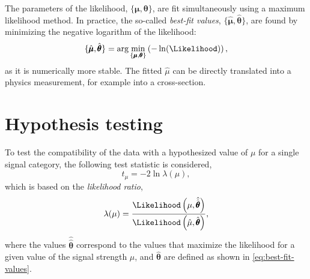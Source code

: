 
The parameters of the likelihood, $\{\pmb{\mu}, \pmb{\theta} \}$, are fit simultaneously using a maximum likelihood method. 
In practice, the so-called \emph{best-fit values}, $\{\hat{\pmb{\mu}}, \hat{\pmb{\theta}} \}$, are found by minimizing the negative logarithm of the likelihood:
\begin{equation}
    \label{eq:best-fit-values}
    \{\hat{\pmb{\mu}}, \hat{\pmb{\theta}} \} = \text{arg} \min_{\{\pmb{\mu}, \pmb{\theta}\}} \left( - \ln (\Likelihood) \right),
\end{equation}
as it is numerically more stable.
The fitted $\hat{\mu}$ can be directly translated into a physics measurement, for example into a cross-section. 



\section{Hypothesis testing}
\label{sec:hypothesis-testing}
To test the compatibility of the data with a hypothesized value of $\mu$ for a single signal category, the following test statistic is considered,
\begin{equation}
    t_\mu = -2 \ln \lambda(\mu),
\end{equation}
which is based on the \emph{likelihood ratio},
\begin{equation}
    \label{eq:likelihoodratio}
    \lambda(\mu) = \frac{ \Likelihood \left( \mu, \hat{\hat{\pmb{\theta}}} \right) } { \Likelihood \left( \hat{\mu} , \hat{\pmb{\theta}} \right) },
\end{equation}
where the values $\hat{\hat{\pmb{\theta}}}$ correspond to the values that maximize the likelihood for a given value of the signal strength $\mu$, and $\hat{\pmb{\theta}}$ are defined as shown in \cref{eq:best-fit-values}. 

